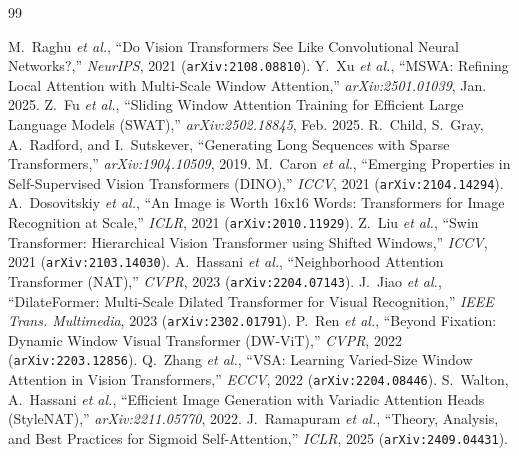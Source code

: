 \documentclass[10pt,a4paper]{article}
\begin{document}
\vspace{-0.4em}
\renewcommand{\refname}{\small\color{primaryblue}Tài liệu Tham khảo (References)}
\begin{thebibliography}{99}
\scriptsize
\setlength{\itemsep}{-1.5pt}
\setlength{\parskip}{0pt}

 M.~Raghu \textit{et al.}, ``Do Vision Transformers See Like Convolutional Neural Networks?,'' \textit{NeurIPS}, 2021 (\texttt{arXiv:2108.08810}).
 Y.~Xu \textit{et al.}, ``MSWA: Refining Local Attention with Multi-Scale Window Attention,'' \textit{arXiv:2501.01039}, Jan. 2025.
 Z.~Fu \textit{et al.}, ``Sliding Window Attention Training for Efficient Large Language Models (SWAT),'' \textit{arXiv:2502.18845}, Feb. 2025.
 R.~Child, S.~Gray, A.~Radford, and I.~Sutskever, ``Generating Long Sequences with Sparse Transformers,'' \textit{arXiv:1904.10509}, 2019.
 M.~Caron \textit{et al.}, ``Emerging Properties in Self-Supervised Vision Transformers (DINO),'' \textit{ICCV}, 2021 (\texttt{arXiv:2104.14294}).
 A.~Dosovitskiy \textit{et al.}, ``An Image is Worth 16x16 Words: Transformers for Image Recognition at Scale,'' \textit{ICLR}, 2021 (\texttt{arXiv:2010.11929}).
 Z.~Liu \textit{et al.}, ``Swin Transformer: Hierarchical Vision Transformer using Shifted Windows,'' \textit{ICCV}, 2021 (\texttt{arXiv:2103.14030}).
 A.~Hassani \textit{et al.}, ``Neighborhood Attention Transformer (NAT),'' \textit{CVPR}, 2023 (\texttt{arXiv:2204.07143}).
 J.~Jiao \textit{et al.}, ``DilateFormer: Multi-Scale Dilated Transformer for Visual Recognition,'' \textit{IEEE Trans. Multimedia}, 2023 (\texttt{arXiv:2302.01791}).
 P.~Ren \textit{et al.}, ``Beyond Fixation: Dynamic Window Visual Transformer (DW-ViT),'' \textit{CVPR}, 2022 (\texttt{arXiv:2203.12856}).
 Q.~Zhang \textit{et al.}, ``VSA: Learning Varied-Size Window Attention in Vision Transformers,'' \textit{ECCV}, 2022 (\texttt{arXiv:2204.08446}).
 S.~Walton, A.~Hassani \textit{et al.}, ``Efficient Image Generation with Variadic Attention Heads (StyleNAT),'' \textit{arXiv:2211.05770}, 2022.
 J.~Ramapuram \textit{et al.}, ``Theory, Analysis, and Best Practices for Sigmoid Self-Attention,'' \textit{ICLR}, 2025 (\texttt{arXiv:2409.04431}).
\end{thebibliography}
\end{document}
